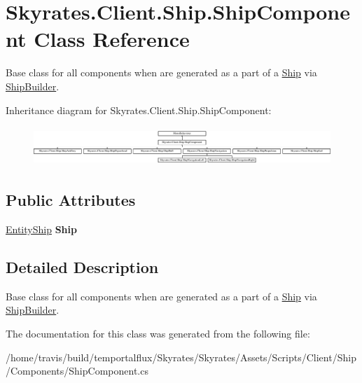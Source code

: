 \hypertarget{class_skyrates_1_1_client_1_1_ship_1_1_ship_component}{\section{Skyrates.\-Client.\-Ship.\-Ship\-Component Class Reference}
\label{class_skyrates_1_1_client_1_1_ship_1_1_ship_component}
}


Base class for all components when are generated as a part of a \hyperlink{class_skyrates_1_1_client_1_1_ship_1_1_ship}{Ship} via \hyperlink{class_skyrates_1_1_client_1_1_ship_1_1_ship_builder}{Ship\-Builder}.  


Inheritance diagram for Skyrates.\-Client.\-Ship.\-Ship\-Component\-:\begin{figure}[H]
\begin{center}
\leavevmode
\includegraphics[height=1.487384cm]{class_skyrates_1_1_client_1_1_ship_1_1_ship_component}
\end{center}
\end{figure}
\subsection*{Public Attributes}
\begin{DoxyCompactItemize}
\item 
\hypertarget{class_skyrates_1_1_client_1_1_ship_1_1_ship_component_af4c14169c6e0cfbf19ddc9240dd95e74}{\hyperlink{class_skyrates_1_1_client_1_1_entity_1_1_entity_ship}{Entity\-Ship} {\bfseries Ship}}\label{class_skyrates_1_1_client_1_1_ship_1_1_ship_component_af4c14169c6e0cfbf19ddc9240dd95e74}

\end{DoxyCompactItemize}


\subsection{Detailed Description}
Base class for all components when are generated as a part of a \hyperlink{class_skyrates_1_1_client_1_1_ship_1_1_ship}{Ship} via \hyperlink{class_skyrates_1_1_client_1_1_ship_1_1_ship_builder}{Ship\-Builder}. 



The documentation for this class was generated from the following file\-:\begin{DoxyCompactItemize}
\item 
/home/travis/build/temportalflux/\-Skyrates/\-Skyrates/\-Assets/\-Scripts/\-Client/\-Ship/\-Components/Ship\-Component.\-cs\end{DoxyCompactItemize}
